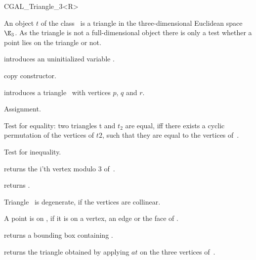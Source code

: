 

\begin {classtemplate} {CGAL_Triangle_3<R>}

  An object $t$ of the class \classname\ is a triangle in
the three-dimensional Euclidean space $\E_3$. As the triangle is not
a full-dimensional object there is only a test whether a point lies on
the triangle or not.
 
\creation
{}


\hidden {}
             {introduces an uninitialized variable \var.}

\hidden {}
 	    {copy constructor.}


\def\CCalternateThreeColumn{\CCtrue}
            {introduces a triangle \var\ with vertices $p$, $q$ and $r$.}


\operations
\threecolumns{5cm}{4cm}

\hidden {}
        {Assignment.}

       {Test for equality: two triangles t and $t_2$ are equal, iff there 
        exists a cyclic permutation of the vertices of $t2$, such that 
        they are equal to the vertices of~\var.}

       {Test for inequality.}

       {returns the i'th vertex modulo 3  of~\var.}

       {returns .}


       {Triangle \var\ is degenerate, if the vertices are collinear.}


       {A point is on \var, if it is on a vertex, an edge or the
        face of \var.}

       {returns a bounding box containing \var.}

       {returns the triangle obtained by applying $at$ on the three
        vertices of~\var.}



\end {classtemplate} 

%
